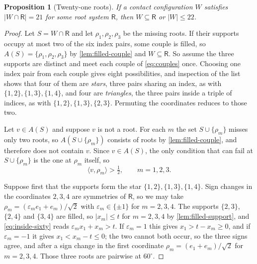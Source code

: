 \documentclass[11pt,reqno]{amsart}
\renewcommand{\_}{\origunderscore\allowbreak}
\numberwithin{equation}{section}
\theoremstyle{plain}
\newtheorem{prop}[thm]{Proposition}
\theoremstyle{definition}
\theoremstyle{remark}
\newcommand{\Rt}{\mathsf{R}}                 %
\begin{document}
\begin{prop}[Twenty-one roots]\label{prop:meet21}
If a contact configuration $W$ satisfies $|W\cap\Rt|=21$ for some root
system $\Rt$, then $W\subseteq\Rt$ or $|W|\le22$.
\end{prop}

\begin{proof}
Let $S=W\cap\Rt$ and let $\rho_1,\rho_2,\rho_3$ be the missing roots. If
their supports occupy at most two of the six index pairs, some couple is
filled, so $A(S)=\{\rho_1,\rho_2,\rho_3\}$ by \cref{lem:filled-couple}
and $W\subseteq\Rt$. So assume the three supports are distinct and meet
each couple of \eqref{eq:couples} once. Choosing one index pair from each
couple gives eight possibilities, and inspection of the list shows that
four of them are \emph{stars}, three pairs sharing an index, as with
$\{1,2\},\{1,3\},\{1,4\}$, and four are \emph{triangles}, the three pairs
inside a triple of indices, as with $\{1,2\},\{1,3\},\{2,3\}$. Permuting
the coordinates reduces to those two.

Let $v\in A(S)$ and suppose $v$ is not a root. For each $m$ the set
$S\cup\{\rho_m\}$ misses only two roots, so $A(S\cup\{\rho_m\})$ consists
of roots by \cref{lem:filled-couple}, and therefore does not contain $v$.
Since $v\in A(S)$, the only condition that can fail at $S\cup\{\rho_m\}$
is the one at $\rho_m$ itself, so
\begin{equation}\label{eq:inside-sixty}
  \langle v,\rho_m\rangle>\tfrac12,\qquad m=1,2,3 .
\end{equation}

Suppose first that the supports form the star $\{1,2\},\{1,3\},\{1,4\}$.
Sign changes in the coordinates $2,3,4$ are symmetries of $\Rt$, so we
may take $\rho_m=(\varepsilon_me_1+e_m)/\sqrt2$ with
$\varepsilon_m\in\{\pm1\}$ for $m=2,3,4$. The supports $\{2,3\}$,
$\{2,4\}$ and $\{3,4\}$ are filled, so $|x_m|\le t$ for $m=2,3,4$ by
\cref{lem:filled-support}, and \eqref{eq:inside-sixty} reads
$\varepsilon_mx_1+x_m>t$. If $\varepsilon_m=1$ this gives
$x_1>t-x_m\ge0$, and if $\varepsilon_m=-1$ it gives $x_1<x_m-t\le0$; the
two cannot both occur, so the three signs agree, and after a sign change
in the first coordinate $\rho_m=(e_1+e_m)/\sqrt2$ for $m=2,3,4$. Those
three roots are pairwise at $60^\circ$.


\end{proof}
\end{document}
